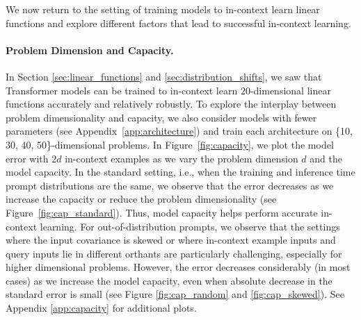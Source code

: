 We now return to the setting of training models to in-context learn linear functions and explore different factors that lead to successful in-context learning.

\paragraph{Problem Dimension and Capacity.}
In Section \ref{sec:linear_functions} and \ref{sec:distribution_shifts}, we saw that Transformer models can be trained to in-context learn 20-dimensional linear functions accurately and relatively robustly. 
To explore the interplay between problem dimensionality and capacity, we also consider models with fewer parameters (see Appendix~\ref{app:architecture}) and train each architecture on \{10, 30, 40, 50\}-dimensional problems.
In Figure~\ref{fig:capacity}, we plot the model error with $2d$ in-context examples as we vary the problem dimension $d$ and the model capacity. 
In the standard setting, i.e., when the training and inference time prompt distributions are the same, we observe that the  error decreases as we increase the capacity or reduce the problem dimensionality (see Figure~\ref{fig:cap_standard}). 
Thus, model capacity helps perform accurate in-context learning.
For out-of-distribution prompts, we observe that the settings where the input covariance is skewed or where in-context example inputs and query inputs lie in different orthants are particularly challenging, especially for higher dimensional problems.
However, the error decreases considerably (in most cases) as we increase the model capacity, even when absolute decrease in the standard error is small (see Figure \ref{fig:cap_random} and \ref{fig:cap_skewed}). 
See Appendix \ref{app:capacity}  for additional plots.



